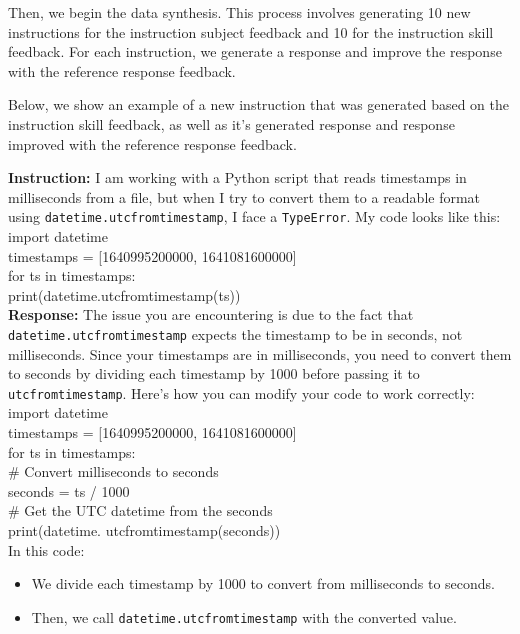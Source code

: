 Then, we begin the data synthesis. This process involves generating 10 new instructions for the instruction subject feedback and 10 for the instruction skill feedback. For each instruction, we generate a response and improve the response with the reference response feedback.

Below, we show an example of a new instruction that was generated based on the instruction skill feedback, as well as it's generated response and response improved with the reference response feedback.

\begin{promptbox}

\textbf{Instruction:} 
I am working with a Python script that reads timestamps in milliseconds from a file, but when I try to convert them to a readable format using \texttt{datetime.utcfromtimestamp}, I face a \texttt{TypeError}. My code looks like this:\\

import datetime\\
timestamps = [1640995200000, 1641081600000]\\
for ts in timestamps:\\
    print(datetime.utcfromtimestamp(ts)) \\

\textbf{Response:}
The issue you are encountering is due to the fact that \texttt{datetime.utcfromtimestamp} expects the timestamp to be in seconds, not milliseconds. Since your timestamps are in milliseconds, you need to convert them to seconds by dividing each timestamp by 1000 before passing it to \texttt{utcfromtimestamp}. Here's how you can modify your code to work correctly:\\

import datetime\\
timestamps = [1640995200000, 1641081600000]\\
for ts in timestamps:\\
    \# Convert milliseconds to seconds\\
    seconds = ts / 1000\\
    \# Get the UTC datetime from the seconds\\
    print(datetime. utcfromtimestamp(seconds))\\

In this code:
\begin{itemize}
\item We divide each timestamp by 1000 to convert from milliseconds to seconds.
\item Then, we call \texttt{datetime.utcfromtimestamp} with the converted value.
\end{itemize}


\end{promptbox}
